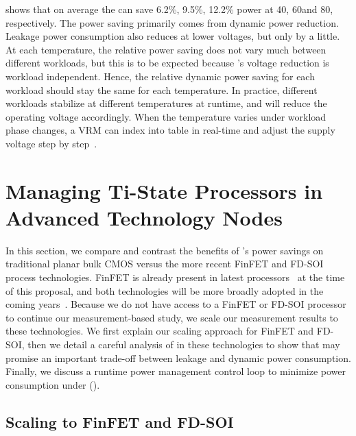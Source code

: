  shows that on average the \tistates can save 6.2\%, 9.5\%, 12.2\% power at 40\C, 60\C and 80\C, respectively. The power saving primarily comes from dynamic power reduction. Leakage power consumption also reduces at lower voltages, but only by a little. At each temperature, the relative power saving does not vary much between different workloads, but this is to be expected because \tistate's voltage reduction is workload independent. Hence, the relative dynamic power saving for each workload should stay the same for each temperature. In practice, different workloads stabilize at different temperatures at runtime, and \tistate will reduce the operating voltage accordingly. When the temperature varies under workload phase changes, a VRM can index into \tistate table in real-time and adjust the supply voltage step by step~\cite{sriram2016avfs}.


\section{Managing Ti-State Processors in Advanced Technology Nodes}
\label{sec:temperature:manage}

In this section, we compare and contrast the benefits of \tistate's power savings on traditional planar bulk CMOS versus the more recent FinFET and FD-SOI process technologies. FinFET is already present in latest processors~\cite{intel22nm,samsung14nm} at the time of this proposal, and both technologies will be more broadly adopted in the coming years~\cite{wu201316nm,natarajan201414nm,lin2014high,liu2014fdsoi}. Because we do not have access to a FinFET or FD-SOI processor to continue our measurement-based study, we scale our measurement results to these technologies. We first explain our scaling approach for FinFET and FD-SOI, then we detail a careful analysis of \tistates in these technologies to show that \tistates may promise an important trade-off between leakage and dynamic power consumption. Finally, we discuss a runtime power management control loop to minimize power consumption under \tistates().

\subsection{Scaling to FinFET and FD-SOI}

